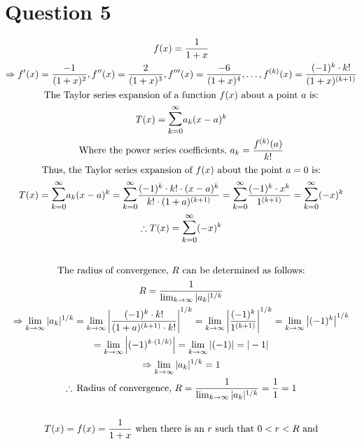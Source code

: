 \documentclass[letterpaper,10pt]{article}
\begin{document}
	\section{Question 5}
		\begin{gather*}
			f(x) = \frac{1}{1+x} \\
			\Rightarrow f'(x) = \frac{-1}{(1+x)^2}, f''(x) = \frac{2}{(1+x)^3}, f'''(x) = \frac{-6}{(1+x)^4}, \dotsc , f^{(k)}(x) = \frac{(-1)^k \cdot k!}{(1+x)^{(k+1)}} \\
			\text{The Taylor series expansion of a function $f(x)$ about a point $a$ is:} \\
			T(x) = \mathlarger{\mathlarger{\sum}}_{k=0}^\infty a_k (x-a)^k \\
			\text{Where the power series coefficients, } a_k = \frac{f^{(k)}(a)}{k!} \\
			\text{Thus, the Taylor series expansion of $f(x)$ about the point $a=0$ is:} \\
			T(x) = \mathlarger{\mathlarger{\sum}}_{k=0}^\infty a_k (x-a)^k = \mathlarger{\mathlarger{\sum}}_{k=0}^\infty \frac{(-1)^k \cdot k! \cdot (x-a)^k}{k! \cdot (1+a)^{(k+1)}} = \mathlarger{\mathlarger{\sum}}_{k=0}^\infty \frac{(-1)^k \cdot x^k}{1^{(k+1)}} = \mathlarger{\mathlarger{\sum}}_{k=0}^\infty (-x)^k \\
			\therefore T(x) = \mathlarger{\mathlarger{\sum}}_{k=0}^\infty (-x)^k \\
			\\
			\text{The radius of convergence, $R$ can be determined as follows:} \\
			R = \frac{1}{\lim_{k \rightarrow \infty} |a_k|^{1/k}} \\
			\Rightarrow \lim_{k \rightarrow \infty} |a_k|^{1/k} = \lim_{k \rightarrow \infty} \left| \frac{(-1)^k \cdot k!}{(1+a)^{(k+1)} \cdot k!} \right|^{1/k} = \lim_{k \rightarrow \infty} \left| \frac{(-1)^k}{1^{(k+1)}} \right|^{1/k} = \lim_{k \rightarrow \infty} \left| (-1)^k \right|^{1/k} \\
			= \lim_{k \rightarrow \infty} \left| (-1)^{k \cdot (1/k)} \right| = \lim_{k \rightarrow \infty} \left| (-1) \right| = |-1| \\
			\Rightarrow \lim_{k \rightarrow \infty} |a_k|^{1/k} = 1 \\
			\therefore \, \text{Radius of convergence, } R = \frac{1}{\lim_{k \rightarrow \infty} |a_k|^{1/k}} = \frac{1}{1} = 1 \\
			\\
			T(x) = f(x) = \frac{1}{1+x} \text{ when there is an $r$ such that $0<r<R$ and} \\

\end{gather*}
\end{document}
